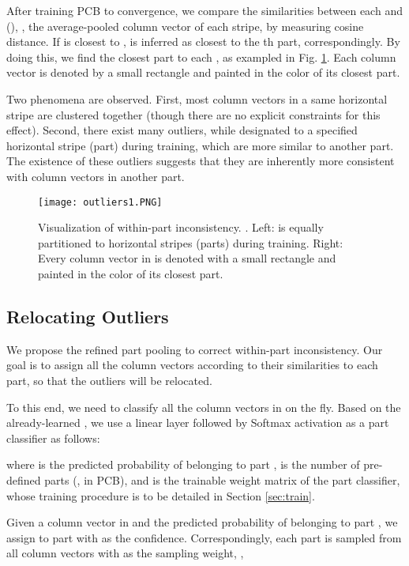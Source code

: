 \documentclass[10pt,twocolumn,letterpaper]{article}
\begin{document}
{{{After training PCB to convergence, we compare the similarities between each  and  (), \ie, the average-pooled column vector of each stripe, by measuring cosine distance. If  is closest to ,  is inferred as closest to the th part, correspondingly. By doing this, we find the closest part to each , as exampled in Fig. \ref{fig:outlier}. Each column vector is denoted by a small rectangle and painted in the color of its closest part. 

Two phenomena are observed. First, most column vectors in a same horizontal stripe are clustered together (though there are no explicit constraints for this effect). Second, there exist many outliers, while designated to a specified horizontal stripe (part) during training, which are more similar to another part. The existence of these outliers suggests that they are inherently more consistent with column vectors in another part.  
\begin{figure}[t]
\setlength{\abovecaptionskip}{-0.1cm} 
\setlength{\belowcaptionskip}{-0.2cm}
\begin{center}
\texttt{[image: outliers1.PNG]}
\end{center}
   \caption{Visualization of within-part inconsistency. \bm{}. Left: \bm{} is equally partitioned to  horizontal stripes (parts) during training. Right: Every column vector in \bm{} is denoted with a small rectangle and painted in the color of its closest part.}
\label{fig:outlier}
\end{figure}


\subsection{Relocating Outliers}\label{sec:relocate}
We propose the refined part pooling to correct within-part inconsistency. Our goal is to assign all the column vectors according to their similarities to each part, so that the outliers will be relocated.  

To this end, we need to classify all the column vectors  in \bm{} on the fly. Based on the already-learned \bm{}, we use a linear layer followed by Softmax activation as a part classifier as follows:

where  is the predicted probability of  belonging to part ,  is the number of pre-defined parts (\ie,  in PCB), and  is the trainable weight matrix of the part classifier, whose training procedure is to be detailed in Section \ref{sec:train}. 

Given a column vector  in  and the predicted probability of  belonging to part , we assign  to part  with  as the confidence. Correspondingly, each part  is sampled from all column vectors  with  as the sampling weight, \ie,


}}}
\end{document}
